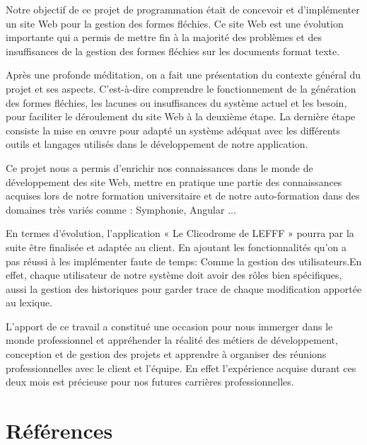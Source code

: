 \documentclass[12pt,a4paper]{article}
\begin{document}
Notre objectif de ce projet de programmation était de concevoir et d'implémenter un site Web pour la gestion des formes fléchies.
Ce site Web est une évolution importante qui a permis de mettre fin à la majorité des problèmes et des insuffisances de la gestion des formes fléchies sur les documents format texte. 


Après une profonde méditation, on a fait une présentation du contexte général du projet et ses aspects. C'est-à-dire comprendre le fonctionnement de la génération des formes fléchies, les lacunes ou insuffisances du système actuel et les besoin, pour faciliter le déroulement du site Web à la deuxième étape. 
La dernière étape consiste la mise en œuvre pour adapté un système
adéquat avec les différents outils et langages utilisés dans le développement de notre application.

Ce projet nous a permis d'enrichir nos connaissances dans le monde de développement des site Web, mettre en pratique une partie des connaissances acquises lors de notre formation universitaire et de notre auto-formation dans des domaines très variés comme :  Symphonie, Angular ...
 

En termes d'évolution, l'application « Le Clicodrome de LEFFF » pourra par la suite être finalisée et adaptée au client.
En ajoutant les fonctionnalités qu'on a pas réussi à les implémenter faute de temps: Comme la gestion des utilisateurs.En effet, chaque utilisateur de notre système doit avoir des rôles bien spécifiques, aussi la gestion des historiques pour garder trace de chaque modification apportée au lexique.

L'apport de ce travail a constitué une occasion pour nous immerger dans le monde professionnel et appréhender la réalité des métiers de développement, conception et de gestion des projets et apprendre à organiser des réunions professionnelles avec le client et l'équipe. En effet l'expérience acquise durant ces deux mois est précieuse pour nos futures carrières professionnelles.
\section{Références}


\end{document}
